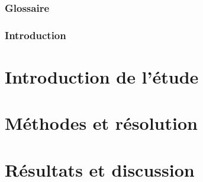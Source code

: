 \documentclass[a4paper, 11pt]{article}
\begin{document}
\newpage

\tableofcontents{}


\newpage

\section*{Glossaire}
	



\newpage
\pagestyle{fancy}
\renewcommand{\thepage}{\arabic{page}}
\setcounter{page}{1}

\section{Introduction}




\part{Introduction de l'étude}


\part{Méthodes et résolution}


\part{Résultats et discussion}




\end{document}
